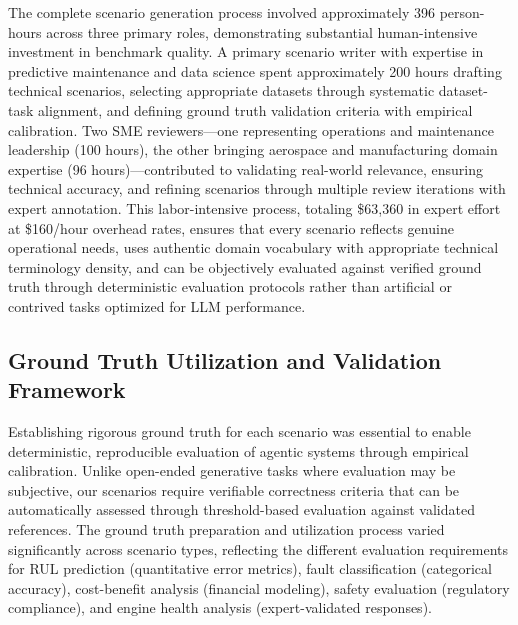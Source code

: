 \documentclass[sigconf]{acmart}
\begin{document}
The complete scenario generation process involved approximately 396 person-hours across three primary roles, demonstrating substantial human-intensive investment in benchmark quality. A primary scenario writer with expertise in predictive maintenance and data science spent approximately 200 hours drafting technical scenarios, selecting appropriate datasets through systematic dataset-task alignment, and defining ground truth validation criteria with empirical calibration. Two SME reviewers---one representing operations and maintenance leadership (100 hours), the other bringing aerospace and manufacturing domain expertise (96 hours)---contributed to validating real-world relevance, ensuring technical accuracy, and refining scenarios through multiple review iterations with expert annotation. This labor-intensive process, totaling \$63,360 in expert effort at \$160/hour overhead rates, ensures that every scenario reflects genuine operational needs, uses authentic domain vocabulary with appropriate technical terminology density, and can be objectively evaluated against verified ground truth through deterministic evaluation protocols rather than artificial or contrived tasks optimized for LLM performance.

\subsection{Ground Truth Utilization and Validation Framework}
\label{subsec:groundtruth}

Establishing rigorous ground truth for each scenario was essential to enable deterministic, reproducible evaluation of agentic systems through empirical calibration. Unlike open-ended generative tasks where evaluation may be subjective, our scenarios require verifiable correctness criteria that can be automatically assessed through threshold-based evaluation against validated references. The ground truth preparation and utilization process varied significantly across scenario types, reflecting the different evaluation requirements for RUL prediction (quantitative error metrics), fault classification (categorical accuracy), cost-benefit analysis (financial modeling), safety evaluation (regulatory compliance), and engine health analysis (expert-validated responses).
\end{document}

